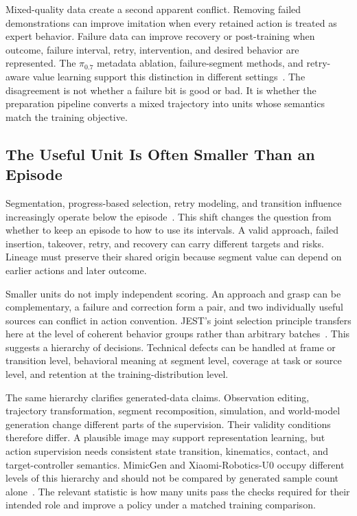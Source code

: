 Mixed-quality data create a second apparent conflict. Removing failed demonstrations can improve imitation when every retained action is treated as expert behavior. Failure data can improve recovery or post-training when outcome, failure interval, retry, intervention, and desired behavior are represented. The $\pi_{0.7}$ metadata ablation, failure-segment methods, and retry-aware value learning support this distinction in different settings~\cite{intelligence20260_2604_15483,wu2024learning_2401_08957,qin2026beyond_2606_24633}. The disagreement is not whether a failure bit is good or bad. It is whether the preparation pipeline converts a mixed trajectory into units whose semantics match the training objective.

\subsection{The Useful Unit Is Often Smaller Than an Episode}

Segmentation, progress-based selection, retry modeling, and transition influence increasingly operate below the episode~\cite{wu2024learning_2401_08957,zhang2025scizor_2505_22626,wu2026sieve_2607_06442,qin2026beyond_2606_24633,lee2026quality_2603_09056}. This shift changes the question from whether to keep an episode to how to use its intervals. A valid approach, failed insertion, takeover, retry, and recovery can carry different targets and risks. Lineage must preserve their shared origin because segment value can depend on earlier actions and later outcome.

Smaller units do not imply independent scoring. An approach and grasp can be complementary, a failure and correction form a pair, and two individually useful sources can conflict in action convention. JEST's joint selection principle transfers here at the level of coherent behavior groups rather than arbitrary batches~\cite{evans2024data_2406_17711}. This suggests a hierarchy of decisions. Technical defects can be handled at frame or transition level, behavioral meaning at segment level, coverage at task or source level, and retention at the training-distribution level.

The same hierarchy clarifies generated-data claims. Observation editing, trajectory transformation, segment recomposition, simulation, and world-model generation change different parts of the supervision. Their validity conditions therefore differ. A plausible image may support representation learning, but action supervision needs consistent state transition, kinematics, contact, and target-controller semantics. MimicGen and Xiaomi-Robotics-U0 occupy different levels of this hierarchy and should not be compared by generated sample count alone~\cite{mandlekar2023mimicgen_2310_17596,li2026xiaomi_2607_11643}. The relevant statistic is how many units pass the checks required for their intended role and improve a policy under a matched training comparison.

